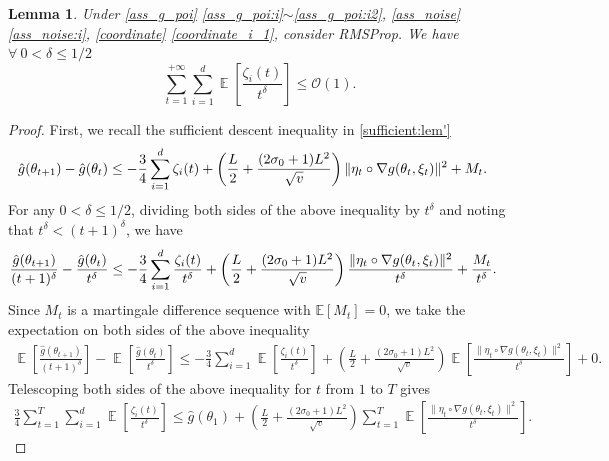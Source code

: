 \documentclass[standalone]{article}
\newcommand{\E}{\mathbb{E}}
\newtheorem{lem}{Lemma}[section]
\DeclareMathOperator{\Expect}{\mathbb{E}}
\begin{document}
\begin{lem}\label{RMSProp_0}
Under \cref{ass_g_poi} \ref{ass_g_poi:i}$\sim$\ref{ass_g_poi:i2}, \cref{ass_noise} \ref{ass_noise:i}, \cref{coordinate} \ref{coordinate_i_1}, consider RMSProp. We have $\forall\ 0<\delta\le 1/2$
\[\sum_{t=1}^{+\infty}\sum_{i=1}^{d}\Expect\left[\frac{\zeta_{i}(t)}{t^{\delta}}\right] \leq \mathcal{O}(1).\]
\end{lem}
\begin{proof}
First, we recall the sufficient descent inequality in \cref{sufficient:lem'}
\begin{align*}
&\hat{g}(\theta_{t+1})-\hat{g}(\theta_{t})\notag \le-\frac{3}{4}\sum_{i=1}^{d}\zeta_{i}(t)+\left(\frac{ L}{2}+\frac{(2\sigma_{0}+1) L^{2}}{\sqrt{v}}\right)\|\eta_t\circ \nabla g(\theta_{t},\xi_{t})\|^{2}+M_{t}.
\end{align*}
For any $0<\delta\le 1/2$, dividing both sides of the above inequality by \(t^{\delta}\) and noting that \(t^{\delta} < (t+1)^{\delta}\), we have
\begin{align*}
 &\frac{\hat{g}(\theta_{t+1})}{(t+1)^{\delta}}-\frac{\hat{g}(\theta_{t})}{t^{\delta}}\notag \le-\frac{3}{4}\sum_{i=1}^{d}\frac{\zeta_{i}(t)}{t^{\delta}}+\left(\frac{ L}{2}+\frac{(2\sigma_{0}+1) L^{2}}{\sqrt{v}}\right)\frac{\|\eta_t\circ \nabla g(\theta_{t},\xi_{t})\|^{2}}{t^{\delta}}+\frac{M_{t}}{t^{\delta}}.   
\end{align*}
Since $M_t$ is a martingale difference sequence with $\E[M_t] = 0$, we take the expectation on both sides of the above inequality
\begin{align*}
    \Expect\left[\frac{\hat{g}(\theta_{t+1})}{(t+1)^{\delta}}\right]-\Expect\left[\frac{\hat{g}(\theta_{t})}{t^{\delta}}\right]\le -\frac{3}{4}\sum_{i=1}^{d}\Expect\left[\frac{\zeta_{i}(t)}{t^{\delta}}\right]+\left(\frac{ L}{2}+\frac{(2\sigma_{0}+1) L^{2}}{\sqrt{v}}\right)\Expect\left[\frac{\|\eta_t\circ \nabla g(\theta_{t},\xi_{t})\|^{2}}{t^{\delta}}\right]+0.
\end{align*}
Telescoping both sides of the above inequality for \(t\) from \(1\) to \(T\) gives
\begin{align}\label{rms_0}
    \frac{3}{4}\sum_{t=1}^{T}\sum_{i=1}^{d}\Expect\left[\frac{\zeta_{i}(t)}{t^{\delta}}\right]\le \hat{g}(\theta_{1})+\left(\frac{ L}{2}+\frac{(2\sigma_{0}+1) L^{2}}{\sqrt{v}}\right)\sum_{t=1}^{T}\Expect\left[\frac{\|\eta_t\circ \nabla g(\theta_{t},\xi_{t})\|^{2}}{t^{\delta}}\right].

\end{align}
\end{proof}
\end{document}

